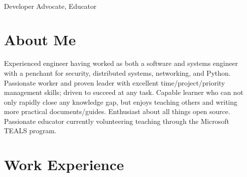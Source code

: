 \documentclass[10pt]{article} %
\begin{document}
\color{text1} %


\par{\\ %
{\color{headings} Developer Advocate, Educator}\\[15pt]\par} 
	

\begin{minipage}[t]{0.5\textwidth} %
\vspace{0pt} %
	
\section{About Me}
Experienced engineer having worked as both a software and systems engineer with a penchant for security, distributed systems, networking, and Python. Passionate worker and proven leader with excellent time/project/priority management skills; driven to succeed at any task. Capable learner who can not only rapidly close any knowledge gap, but enjoys teaching others and writing more practical documents/guides. Enthusiast about all things open source. Passionate educator currently volunteering teaching through the Microsoft TEALS program. \\


\section{Work Experience} 



\end{minipage}
\end{document}
